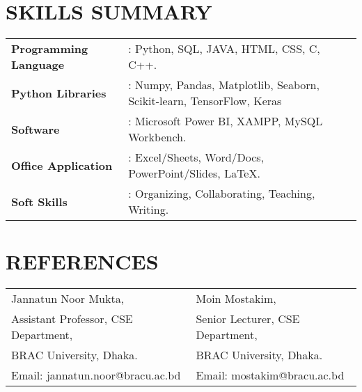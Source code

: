 \documentclass[letterpaper,11pt]{article}
\begin{document}
\section*{\textbf{SKILLS SUMMARY}}
\begin{tabular}{@{}p{} p{}}
    \textbf{Programming Language} & : Python, SQL, JAVA, HTML, CSS, C, C++.\\
    \textbf{Python Libraries} & : Numpy, Pandas, Matplotlib, Seaborn, Scikit-learn, TensorFlow, Keras\\
    \textbf{Software} & : Microsoft Power BI, XAMPP, MySQL Workbench. \\
    \textbf{Office Application} & : Excel/Sheets, Word/Docs, PowerPoint/Slides, LaTeX.\\
     \textbf{Soft Skills} & : Organizing, Collaborating, Teaching, Writing. \\
\end{tabular}


\section*{\textbf{REFERENCES}}
\begin{tabular}{@{}p{} p{}}
    Jannatun Noor Mukta, & Moin Mostakim, \\
    Assistant Professor, CSE Department, & Senior Lecturer, CSE Department, \\
    BRAC University, Dhaka. & BRAC University, Dhaka. \\
    Email: jannatun.noor@bracu.ac.bd & Email: mostakim@bracu.ac.bd \\
\end{tabular}
\end{document}
